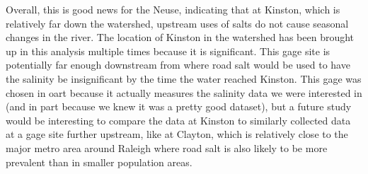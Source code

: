 \documentclass[
  12pt,
]{article}
\begin{document}
Overall, this is good news for the Neuse, indicating that at Kinston,
which is relatively far down the watershed, upstream uses of salts do
not cause seasonal changes in the river. The location of Kinston in the
watershed has been brought up in this analysis multiple times because it
is significant. This gage site is potentially far enough downstream from
where road salt would be used to have the salinity be insignificant by
the time the water reached Kinston. This gage was chosen in oart because
it actually measures the salinity data we were interested in (and in
part because we knew it was a pretty good dataset), but a future study
would be interesting to compare the data at Kinston to similarly
collected data at a gage site further upstream, like at Clayton, which
is relatively close to the major metro area around Raleigh where road
salt is also likely to be more prevalent than in smaller population
areas.
\end{document}
